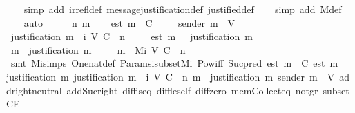 \begin{isabellebody}
%
\isadelimproof
\ \ %
\endisadelimproof
%
\isatagproof
{}\isamarkupfalse%
\ {\isacharparenleft}simp\ add{\isacharcolon}\ irrefl{\isacharunderscore}def\ message{\isacharunderscore}justification{\isacharunderscore}def\ justified{\isacharunderscore}def{\isacharparenright}\isanewline
\ \ \isamarkupfalse%
\ {\isacharparenleft}simp\ add{\isacharcolon}\ M{\isacharunderscore}def{\isacharparenright}\isanewline
\ \ \isamarkupfalse%
\ auto\isanewline
{}\isamarkupfalse%
\ {\isacharminus}\isanewline
\ \ \isamarkupfalse%
\ n\ m\isanewline
\ \ \isamarkupfalse%
\ {\isachardoublequoteopen}est\ m\ {\isasymin}\ C{\isachardoublequoteclose}\ \isanewline
\ \ \isamarkupfalse%
\ {\isachardoublequoteopen}sender\ m\ {\isasymin}\ V{\isachardoublequoteclose}\isanewline
\ \ \isamarkupfalse%
\ {\isachardoublequoteopen}justification\ m\ {\isasymin}\ {\isasymSigma}{\isacharunderscore}i\ {\isacharparenleft}V{\isacharcomma}\ C{\isacharcomma}\ {\isasymepsilon}{\isacharparenright}\ n{\isachardoublequoteclose}\ \isanewline
\ \ \isamarkupfalse%
\ {\isachardoublequoteopen}est\ m\ {\isasymin}\ {\isasymepsilon}\ {\isacharparenleft}justification\ m{\isacharparenright}{\isachardoublequoteclose}\ \isanewline
\ \ \isamarkupfalse%
\ {\isachardoublequoteopen}m\ {\isasymin}\ justification\ m{\isachardoublequoteclose}\isanewline
\ \ \isamarkupfalse%
\ \ {\isachardoublequoteopen}m\ {\isasymin}\ M{\isacharunderscore}i\ {\isacharparenleft}V{\isacharcomma}\ C{\isacharcomma}\ {\isasymepsilon}{\isacharparenright}\ {\isacharparenleft}n\ {\isacharminus}\ {}{\isacharparenright}{\isachardoublequoteclose}\isanewline
\ \ \ \ \isamarkupfalse%
\ {\isacharparenleft}smt\ M{\isacharunderscore}i{\isachardot}simps\ One{\isacharunderscore}nat{\isacharunderscore}def\ Params{\isachardot}{\isasymSigma}i{\isacharunderscore}subset{\isacharunderscore}Mi\ Pow{\isacharunderscore}iff\ Suc{\isacharunderscore}pred\ {\isacartoucheopen}est\ m\ {\isasymin}\ C{\isacartoucheclose}\ {\isacartoucheopen}est\ m\ {\isasymin}\ {\isasymepsilon}\ {\isacharparenleft}justification\ m{\isacharparenright}{\isacartoucheclose}\ {\isacartoucheopen}justification\ m\ {\isasymin}\ {\isasymSigma}{\isacharunderscore}i\ {\isacharparenleft}V{\isacharcomma}\ C{\isacharcomma}\ {\isasymepsilon}{\isacharparenright}\ n{\isacartoucheclose}\ {\isacartoucheopen}m\ {\isasymin}\ justification\ m{\isacartoucheclose}\ {\isacartoucheopen}sender\ m\ {\isasymin}\ V{\isacartoucheclose}\ add{\isachardot}right{\isacharunderscore}neutral\ add{\isacharunderscore}Suc{\isacharunderscore}right\ diff{\isacharunderscore}is{\isacharunderscore}{}{\isacharunderscore}eq{\isacharprime}\ diff{\isacharunderscore}le{\isacharunderscore}self\ diff{\isacharunderscore}zero\ mem{\isacharunderscore}Collect{\isacharunderscore}eq\ not{\isacharunderscore}gr{}\ subsetCE{\isacharparenright}\isanewline

\end{isabellebody}
